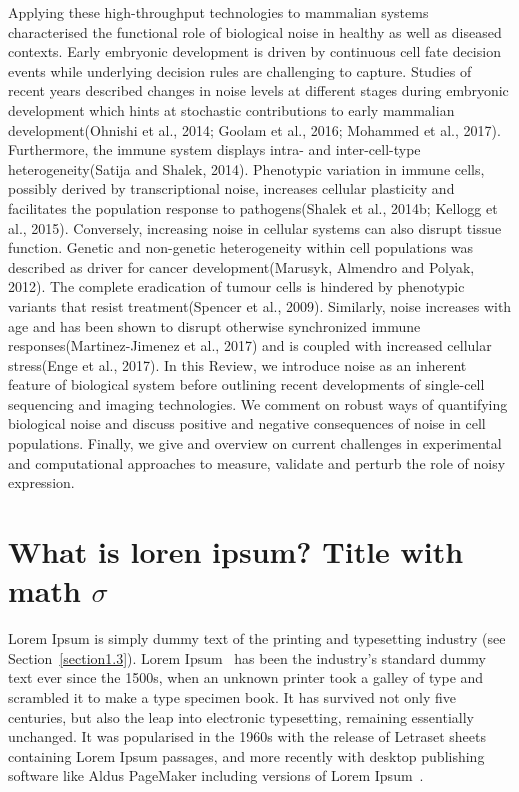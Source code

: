 \begin{Abstract}
Applying these high-throughput technologies to mammalian systems characterised the functional role of biological noise in healthy as well as diseased contexts. Early embryonic development is driven by continuous cell fate decision events while underlying decision rules are challenging to capture. Studies of recent years described changes in noise levels at different stages during embryonic development which hints at stochastic contributions to early mammalian development(Ohnishi et al., 2014; Goolam et al., 2016; Mohammed et al., 2017). Furthermore, the immune system displays intra- and inter-cell-type heterogeneity(Satija and Shalek, 2014). Phenotypic variation in immune cells, possibly derived by transcriptional noise, increases cellular plasticity and facilitates the population response to pathogens(Shalek et al., 2014b; Kellogg et al., 2015).
Conversely, increasing noise in cellular systems can also disrupt tissue function. Genetic and non-genetic heterogeneity within cell populations was described as driver for cancer development(Marusyk, Almendro and Polyak, 2012). The complete eradication of tumour cells is hindered by phenotypic variants that resist treatment(Spencer et al., 2009). Similarly, noise increases with age and has been shown to disrupt otherwise synchronized immune responses(Martinez-Jimenez et al., 2017) and is coupled with increased cellular stress(Enge et al., 2017).
In this Review, we introduce noise as an inherent feature of biological system before outlining recent developments of single-cell sequencing and imaging technologies. We comment on robust ways of quantifying biological noise and discuss positive and negative consequences of noise in cell populations. Finally, we give and overview on current challenges in experimental and computational approaches to measure, validate and perturb the role of noisy expression.
\end{Abstract}

%


\section{What is loren ipsum? Title with math \texorpdfstring{$\sigma$}{[sigma]}} %

Lorem Ipsum is simply dummy text of the printing and typesetting industry (see 
Section~\ref{section1.3}). Lorem Ipsum~\citep{Aup91} has been the industry's 
standard dummy text ever since the 1500s, when an unknown printer took a galley 
of type and scrambled it to make a type specimen book. It has survived not only 
five centuries, but also the leap into electronic typesetting, remaining 
essentially unchanged. It was popularised in the 1960s with the release of 
Letraset sheets containing Lorem Ipsum passages, and more recently with desktop 
publishing software like Aldus PageMaker including versions of Lorem 
Ipsum~\citep{AAB95,Con90,LM65}.

